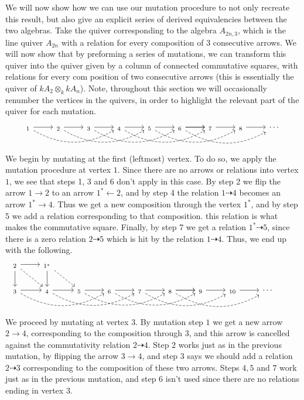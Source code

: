 \documentclass[12pt, dvipsnames, oneside]{amsart}
\theoremstyle{definition}
\begin{document}
We will now show how we can use our mutation procedure to not only recreate this result, but also give an explicit series of derived equivalencies between the two algebras.
Take the quiver corresponding to the algebra $A_{2n,3}$, which is the line quiver $A_{2n}$ with a relation for every composition of 3 consecutive arrows. We will now show that by preforming a series of mutations, we can transform this quiver into the quiver given by a column of connected commutative squares, with relations for every com position of two consecutive arrows (this is essentially the quiver of $kA_2 \otimes_k kA_n$). Note, throughout this section we will occasionally renumber the vertices in the quivers, in order to highlight the relevant part of the quiver for each mutation.
\begin{equation*}
\begin{tikzcd}
_1 \arrow[r] \arrow[rrr, bend right, dashed] & _2 \arrow[r] \arrow[rrr, bend right, dashed] & _3 \arrow[r] \arrow[rrr, bend right, dashed] & _4 \arrow[r] \arrow[rrr, bend right, dashed] & _5 \arrow[r] \arrow[rrr, bend right, dashed] & _6 \arrow[r] \arrow[r] \arrow[rrr, bend right, dashed] & _7 \arrow[r] & _8 \arrow[r]  & \cdots
\end{tikzcd}
\end{equation*}
We begin by mutating at the first (leftmost) vertex. 
To do so, we apply the mutation procedure at vertex $1$. Since there are no arrows or relations into vertex $1$, we see that steps 1, 3 and 6 don't apply in this case. By step 2 we flip the arrow $1\rightarrow 2$ to an arrow $1^*\leftarrow 2$, and by step 4 the relation $1\dashrightarrow 4$ becomes an arrow $1^*\rightarrow 4$. Thus we get a new composition through the vertex $1^*$, and by step 5 we add a relation corresponding to that composition. this relation is what makes the commutative square. Finally, by step 7 we get a relation $1^*\dashrightarrow 5$, since there is a zero relation $2\dashrightarrow 5$ which is hit by the relation $1\dashrightarrow 4$. Thus, we end up with the following.
\begin{equation*}
\begin{tikzcd}
_2 \arrow[d] \arrow[r] \arrow[dr, dashed] & _{1^*} \arrow[d] \arrow[dr, dashed] & & & & & & &\\
_3 \arrow[r] \arrow[rrr, bend right, dashed] & _4 \arrow[r] \arrow[rrr, bend right, dashed] & _5 \arrow[r] \arrow[rrr, bend right, dashed] & _6 \arrow[r] \arrow[rrr, bend right, dashed] & _7 \arrow[r] \arrow[rrr, bend right, dashed] & _8 \arrow[r] \arrow[r] \arrow[rrr, bend right, dashed] & _9 \arrow[r] & _{10} \arrow[r] & \cdots  &
\end{tikzcd}
\end{equation*}
We proceed by mutating at vertex $3$. By mutation step $1$ we get a new arrow $2\rightarrow 4$, corresponding to the composition through $3$, and this arrow is cancelled against the commutativity relation $2\dashrightarrow 4$. Step $2$ works just as in the previous mutation, by flipping the arrow $3\rightarrow 4$, and step $3$ says we should add a relation $2\dashrightarrow 3$ corresponding to the composition of these two arrows. Steps $4, 5$ and $7$ work just as in the previous mutation, and step $6$ isn't used since there are no relations ending in vertex $3$.
\end{document}
